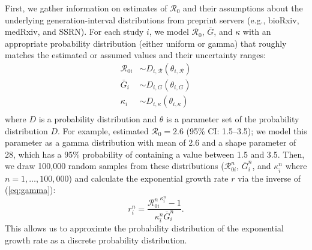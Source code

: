 \documentclass[12pt]{article}
\newcommand{\eref}[1]{(\ref{eq:#1})}
\begin{document}
First, we gather information on estimates of $\mathcal R_0$ and their
assumptions about the underlying generation-interval distributions from preprint servers (e.g., bioRxiv, medRxiv, and SSRN).
For each study $i$, we model $\mathcal R_0$, $\bar G$, and $\kappa$ with an appropriate probability distribution (either uniform or gamma) that roughly matches the estimated or assumed values and their uncertainty ranges:
\begin{equation}
\begin{aligned}
\mathcal R_{0i} &\sim D_{i, \mathcal R}(\theta_{i, \mathcal R})\\
{\bar G}_i &\sim D_{i, G}(\theta_{i, G})\\
\kappa_i &\sim D_{i, \kappa}(\theta_{i, \kappa})\\
\end{aligned}
\end{equation}
where $D$ is a probability distribution and $\theta$ is a parameter set of the probability distribution $D$.
For example, \cite{imaincov} estimated $\mathcal R_0 = 2.6$ (95\% CI: 1.5--3.5);
we model this parameter as a gamma distribution with mean of 2.6 and a shape parameter of 28, which has a 95\% probability of containing a value between 1.5 and 3.5.
Then, we draw 100,000 random samples from these distributions ($\mathcal R_{0i}^n$, ${\bar G}_i^n$, and $\kappa_i^n$ where $n = 1, \dots, 100,000$) and calculate the exponential growth rate $r$ via the inverse of \eref{gamma}:
\begin{equation}
r_i^n = \frac{{\mathcal R_{0i}^n}^{\kappa_i^n} - 1}{\kappa_i^n \bar{G}_i^n}.
\end{equation}
This allows us to approximte the probability distribution of the exponential growth rate as a discrete probability distribution.
\end{document}

